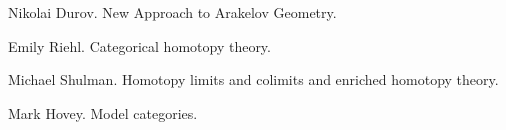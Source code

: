 %
%
%

\newpage


\begin{thebibliography}{9}
	
	Nikolai Durov. New Approach to Arakelov Geometry.
	
	Emily Riehl. Categorical homotopy theory.
	
	Michael Shulman. Homotopy limits and colimits and enriched homotopy theory.
	
	Mark Hovey. Model categories.
	
\end{thebibliography}








